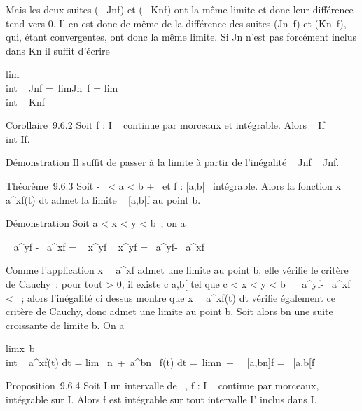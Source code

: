 Mais les deux suites (\int ~
Jn\textbar{}f\textbar{}) et
(\int ~
Kn\textbar{}f\textbar{}) ont la même limite et donc
leur différence tend vers 0. Il en est donc de même de la différence des
suites (\int  Jn~f) et
(\int  Kn~f), qui, étant
convergentes, ont donc la même limite. Si Jn n'est pas
forcément inclus dans Kn il suffit d'écrire

lim\\int ~
Jnf =\
lim\int  Jn\cupKn~f
= lim\\int ~
Knf

Corollaire~9.6.2 Soit f : I \rightarrow~  continue par morceaux et intégrable.
Alors \left \textbar{}\int ~
If\right \textbar{}\leq\\int
 I\textbar{}f\textbar{}.

Démonstration Il suffit de passer à la limite à partir de l'inégalité
\left \textbar{}\int ~
Jnf\right \textbar{}
\leq\int ~
Jn\textbar{}f\textbar{}.

Théorème~9.6.3 Soit -\infty~ \textless{} a \textless{} b \leq +\infty~ et f :
{[}a,b{[}\rightarrow~ \mathbb{C} intégrable. Alors la fonction
x\mapsto~\int ~
a^xf(t) dt admet la limite \int ~
{[}a,b{[}f au point b.

Démonstration Soit a \textless{} x \textless{} y \textless{} b~; on a

\left \textbar{}\int ~
a^yf -\int ~
a^xf\right \textbar{} =
\left \textbar{}\int ~
x^yf\right
\textbar{}\leq\int ~
x^y\textbar{}f\textbar{} =\int ~
a^y\textbar{}f\textbar{}-\int ~
a^x\textbar{}f\textbar{}

Comme l'application
x\mapsto~\int ~
a^x\textbar{}f\textbar{} admet une limite au point b,
elle vérifie le critère de Cauchy~: pour tout \epsilon \textgreater{} 0, il
existe c \in {[}a,b{[} tel que c \textless{} x \textless{} y \textless{} b
\rigtharrow~\left \textbar{}\int ~
a^y\textbar{}f\textbar{}-\int ~
a^x\textbar{}f\textbar{}\right \textbar{}
\textless{} \epsilon~; alors l'inégalité ci dessus montre que
x\mapsto~\int ~
a^xf(t) dt vérifie également ce critère de Cauchy, donc
admet une limite au point b. Soit alors bn une suite
croissante de limite b. On a

limx\rightarrow~b\\int ~
a^xf(t) dt = lim~
n\rightarrow~+\infty~\int  a^bn ~f(t)
dt =\
limn\rightarrow~+\infty~\int ~
{[}a,bn{]}f =\int ~
{[}a,b{[}f

Proposition~9.6.4 Soit I un intervalle de ~, f : I \rightarrow~  continue par
morceaux, intégrable sur I. Alors f est intégrable sur tout intervalle
I' inclus dans I.

